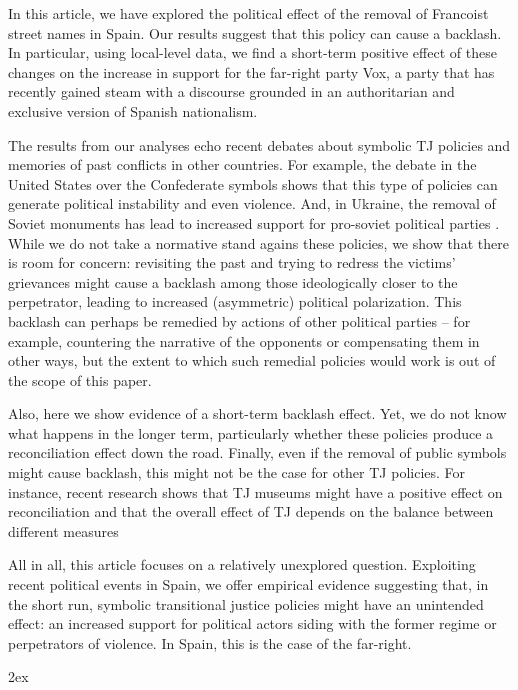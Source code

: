 \documentclass[12pt, notitlepage]{article}
\begin{document}
In this article, we have explored the political effect of the removal of Francoist street names in Spain.
Our results suggest that this policy can cause a backlash. In particular, using local-level data, we find a short-term positive effect of these changes on the increase in support for the far-right party Vox, a party that has recently gained steam with a discourse grounded in an authoritarian and exclusive version of Spanish nationalism.

The results from our analyses echo recent debates about symbolic TJ policies and memories of past conflicts in other countries. For example, the debate in the United States over the Confederate symbols shows that this type of policies can generate political instability and even violence. And, in Ukraine, the removal of Soviet monuments has lead to increased support for pro-soviet political parties \citep{Rozenas:2021}. While we do not take a normative stand agains these policies, we show that there is room for concern: revisiting the past and trying to redress the victims' grievances might cause a backlash among those ideologically closer to the perpetrator, leading to increased (asymmetric) political polarization. This backlash can perhaps be remedied by actions of other political parties -- for example, countering the narrative of the opponents or compensating them in other ways, but the extent to which such remedial policies would work is out of the scope of this paper.

Also, here we show evidence of a short-term backlash effect. Yet, we do not know what happens in the longer term, particularly whether these policies produce a reconciliation effect down the road. Finally, even if the removal of public symbols might cause backlash, this might not be the case for other TJ policies. For instance, recent research shows that TJ museums might have a positive effect on reconciliation \citep{Balcells:2020aa} and that the overall effect of TJ depends on the balance between different measures \citep{Olsen:2010aa, Loyle:2017aa}

All in all, this article focuses on a relatively unexplored question. Exploiting recent political events in Spain, we offer empirical evidence suggesting that, in the short run, symbolic transitional justice policies might have an unintended effect: an increased support for political actors siding with the former regime or perpetrators of violence. In Spain, this is the case of the far-right.

\newpage
\begingroup
\parindent 0pt
\parskip 2ex
\def\enotesize{\normalsize}
\theendnotes
\endgroup

\clearpage



\newpage

\end{document}
